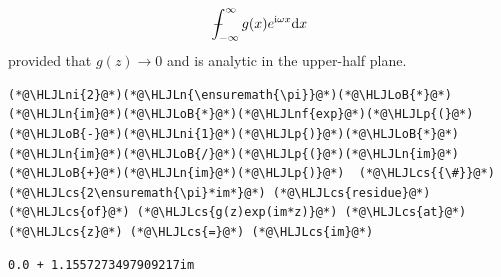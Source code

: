 \documentclass[12pt,a4paper]{article}
\newcommand{\HLJLn}[1]{#1}
\newcommand{\HLJLnf}[1]{\textcolor[RGB]{66,102,213}{#1}}
\newcommand{\HLJLni}[1]{\textcolor[RGB]{59,151,46}{#1}}
\newcommand{\HLJLoB}[1]{\textcolor[RGB]{102,102,102}{\textbf{#1}}}
\newcommand{\HLJLp}[1]{#1}
\newcommand{\HLJLcs}[1]{\textcolor[RGB]{153,153,119}{\textit{#1}}}
\def\D{ {\rm d} }
\def\I{ {\rm i} }
\def\Xint#1{ \mathchoice
   {\XXint\displaystyle\textstyle{#1} }%
   {\XXint\textstyle\scriptstyle{#1} }%
   {\XXint\scriptstyle\scriptscriptstyle{#1} }%
   {\XXint\scriptscriptstyle\scriptscriptstyle{#1} }%
   \!\int}
\def\XXint#1#2#3{ {\setbox0=\hbox{$#1{#2#3}{\int}$}
     \vcenter{\hbox{$#2#3$}}\kern-.5\wd0} }
\def\dashint{\Xint-}
\def\infdashint{\dashint_{-\infty}^\infty}
\def\dx{\D x}
\begin{document}
\[
\infdashint g(x) e^{\I \omega x} \dx
\]
provided that $g(z) \rightarrow 0$ and is analytic in the upper-half plane.


\begin{lstlisting}
(*@\HLJLni{2}@*)(*@\HLJLn{\ensuremath{\pi}}@*)(*@\HLJLoB{*}@*)(*@\HLJLn{im}@*)(*@\HLJLoB{*}@*)(*@\HLJLnf{exp}@*)(*@\HLJLp{(}@*)(*@\HLJLoB{-}@*)(*@\HLJLni{1}@*)(*@\HLJLp{)}@*)(*@\HLJLoB{*}@*)(*@\HLJLn{im}@*)(*@\HLJLoB{/}@*)(*@\HLJLp{(}@*)(*@\HLJLn{im}@*)(*@\HLJLoB{+}@*)(*@\HLJLn{im}@*)(*@\HLJLp{)}@*)  (*@\HLJLcs{{\#}}@*) (*@\HLJLcs{2\ensuremath{\pi}*im*}@*) (*@\HLJLcs{residue}@*) (*@\HLJLcs{of}@*) (*@\HLJLcs{g(z)exp(im*z)}@*) (*@\HLJLcs{at}@*) (*@\HLJLcs{z}@*) (*@\HLJLcs{=}@*) (*@\HLJLcs{im}@*)
\end{lstlisting}

\begin{lstlisting}
0.0 + 1.1557273497909217im
\end{lstlisting}
\end{document}
